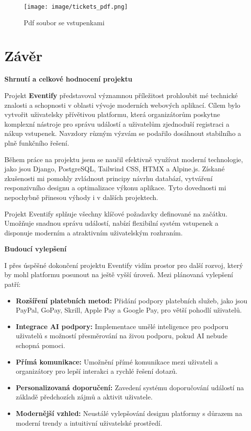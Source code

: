 \documentclass[12pt, a4paper,
twoside,        %
openright
]{report}
\begin{document}
	\begin{figure}[h!]
		\centering %
		\texttt{[image: image/tickets\_pdf.png]} %
		\caption{Pdf soubor se vstupenkami} %
		\label{fig:ticketspdf} %
	\end{figure}
	
	\chapter*{Závěr}
	
	\textbf{Shrnutí a celkové hodnocení projektu}
	
	Projekt \textbf{Eventify} představoval významnou příležitost prohloubit mé technické znalosti \linebreak a schopnosti v oblasti vývoje moderních webových aplikací. Cílem bylo vytvořit uživatelsky přívětivou platformu, která organizátorům poskytne komplexní nástroje pro správu událostí \linebreak a uživatelům zjednoduší registraci a nákup vstupenek. Navzdory různým výzvám se podařilo dosáhnout stabilního a plně funkčního řešení.
	
	Během práce na projektu jsem se naučil efektivně využívat moderní technologie, jako jsou Django, PostgreSQL, Tailwind CSS, HTMX a Alpine.js. Získané zkušenosti mi pomohly zvládnout principy návrhu databází, vytváření responzivního designu a optimalizace výkonu aplikace. Tyto dovednosti mi nepochybně přinesou výhody i v dalších projektech.
	
	Projekt Eventify splňuje všechny klíčové požadavky definované na začátku. Umožňuje snadnou správu událostí, nabízí flexibilní systém vstupenek a disponuje moderním a atraktivním uživatelským rozhraním. 
	
\textbf{Budoucí vylepšení}
	
	I přes úspěšné dokončení projektu Eventify vidím prostor pro další rozvoj, který by mohl platformu posunout na ještě vyšší úroveň. Mezi plánovaná vylepšení patří:
	
	\begin{itemize}
		\item \textbf{Rozšíření platebních metod:} Přidání podpory platebních služeb, jako jsou PayPal, \linebreak GoPay, Skrill, Apple Pay a Google Pay, pro větší pohodlí uživatelů.
		\item \textbf{Integrace AI podpory:} Implementace umělé inteligence pro podporu uživatelů s možností přesměrování na živou podporu, pokud AI nebude schopná pomoci.
		\item \textbf{Přímá komunikace:} Umožnění přímé komunikace mezi uživateli a organizátory pro lepší interakci a rychlé řešení dotazů.
		\item \textbf{Personalizovaná doporučení:} Zavedení systému doporučování událostí na základě předchozích zájmů a aktivit uživatele.
		\item \textbf{Modernější vzhled:} Neustálé vylepšování designu platformy s důrazem na moderní trendy a intuitivní uživatelské prostředí.
	\end{itemize}
	
\end{document}
